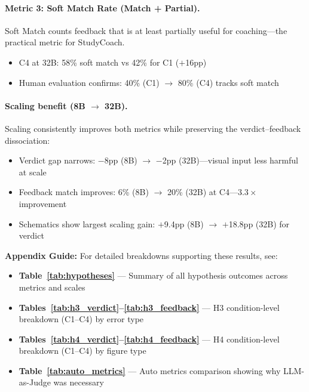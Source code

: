 \documentclass{article} %
\begin{document}
\paragraph{Metric 3: Soft Match Rate (Match + Partial).}
Soft Match counts feedback that is at least partially useful for coaching---the practical metric for StudyCoach.

\begin{itemize}[itemsep=2pt, topsep=2pt]
    \item C4 at 32B: 58\% soft match vs 42\% for C1 ($+$16pp)
    \item Human evaluation confirms: 40\% (C1) $\to$ 80\% (C4) tracks soft match
\end{itemize}

\paragraph{Scaling benefit (8B $\to$ 32B).}
Scaling consistently improves both metrics while preserving the verdict--feedback dissociation:
\begin{itemize}[itemsep=2pt, topsep=2pt]
    \item Verdict gap narrows: $-$8pp (8B) $\to$ $-$2pp (32B)---visual input less harmful at scale
    \item Feedback match improves: 6\% (8B) $\to$ 20\% (32B) at C4---$3.3{\times}$ improvement
    \item Schematics show largest scaling gain: $+$9.4pp (8B) $\to$ $+$18.8pp (32B) for verdict
\end{itemize}

\vspace{4pt}
\noindent{}

\vspace{6pt}
\noindent\textbf{Appendix Guide:} For detailed breakdowns supporting these results, see:
\begin{itemize}[itemsep=1pt, topsep=2pt, leftmargin=*]
  \item \textbf{Table~\ref{tab:hypotheses}} --- Summary of all hypothesis outcomes across metrics and scales
  \item \textbf{Tables~\ref{tab:h3_verdict}--\ref{tab:h3_feedback}} --- H3 condition-level breakdown (C1--C4) by error type
  \item \textbf{Tables~\ref{tab:h4_verdict}--\ref{tab:h4_feedback}} --- H4 condition-level breakdown (C1--C4) by figure type
  \item \textbf{Table~\ref{tab:auto_metrics}} --- Auto metrics comparison showing why LLM-as-Judge was necessary
\end{itemize}
\end{document}

